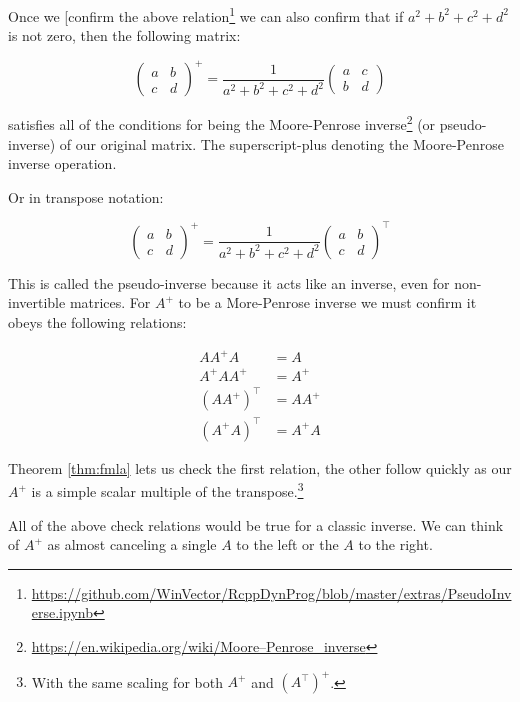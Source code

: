 \documentclass{article}
\begin{document}
Once we [confirm the above relation\footnote{\url{https://github.com/WinVector/RcppDynProg/blob/master/extras/PseudoInverse.ipynb}} we can also confirm that if $a^2 + b^2 + c^2 + d^2$ is not zero, then the following matrix:

\[ 
\begin{pmatrix} a & b \\ c & d \end{pmatrix}^{+}
=
\frac{1}{a^2 + b^2 + c^2 + d^2}
\begin{pmatrix} a & c \\ b & d \end{pmatrix}
\]

satisfies all of the conditions for being the Moore-Penrose inverse\footnote{\url{https://en.wikipedia.org/wiki/Moore–Penrose_inverse}} (or pseudo-inverse) of our original matrix.  The superscript-plus denoting the Moore-Penrose inverse operation.

Or in transpose notation:

\[ 
\begin{pmatrix} a & b \\ c & d \end{pmatrix}^{+}
=
\frac{1}{a^2 + b^2 + c^2 + d^2}
\begin{pmatrix} a & b \\ c & d \end{pmatrix}^{\top}
\]

This is called the pseudo-inverse because it acts like an inverse, even for non-invertible matrices.  For $A^{+}$ to be
a More-Penrose inverse we must confirm it obeys the following relations:

\begin{align*}
A A^{+} A &= A \\
A^{+} A A^{+} &= A^{+} \\
(A A^{+})^{\top} &= A A^{+} \\
(A^{+} A)^{\top} &= A^{+} A
\end{align*}

Theorem \ref{thm:fmla} lets us check the first relation, the other follow quickly as our $A^{+}$ is a simple scalar multiple of the transpose.\footnote{With the same scaling for both $A^{+}$ and $(A^{\top})^{+}$.}

All of the above check relations would be true for a classic inverse.  We can think of $A^{+}$ as almost canceling a single $A$ to the left or the $A$ to the right.
\end{document}
